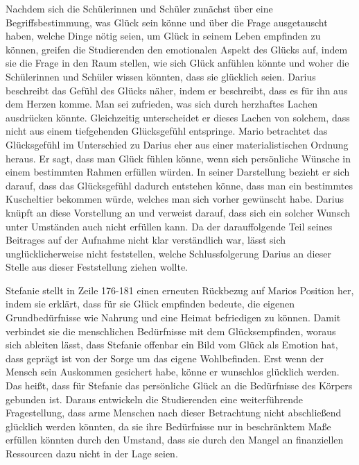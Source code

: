 Nachdem sich die Schülerinnen und Schüler zunächst über eine Begriffsbestimmung, was Glück sein könne und über die Frage ausgetauscht haben, welche Dinge nötig seien, um Glück in seinem Leben empfinden zu können, greifen die Studierenden den emotionalen Aspekt des Glücks auf, indem sie die Frage in den Raum stellen, wie sich Glück anfühlen könnte und woher die Schülerinnen und Schüler wissen könnten, dass sie glücklich seien. 
Darius beschreibt das Gefühl des Glücks näher, indem er beschreibt, dass es für ihn aus dem Herzen komme. 
Man sei zufrieden, was sich durch herzhaftes Lachen ausdrücken könnte. 
Gleichzeitig unterscheidet er dieses Lachen von solchem, dass nicht aus einem tiefgehenden Glücksgefühl entspringe. 
Mario betrachtet das Glücksgefühl im Unterschied zu Darius eher aus einer materialistischen Ordnung heraus. 
Er sagt, dass man Glück fühlen könne, wenn sich persönliche Wünsche in einem bestimmten Rahmen erfüllen würden. 
In seiner Darstellung bezieht er sich darauf, dass das Glücksgefühl dadurch entstehen könne, dass man ein bestimmtes Kuscheltier bekommen würde, welches man sich vorher gewünscht habe. 
Darius knüpft an diese Vorstellung an und verweist darauf, dass sich ein solcher Wunsch unter Umständen auch nicht erfüllen kann. 
Da der darauffolgende Teil seines Beitrages auf der Aufnahme nicht klar verständlich war, lässt sich unglücklicherweise nicht feststellen, welche Schlussfolgerung Darius an dieser Stelle aus dieser Feststellung ziehen wollte. 

Stefanie stellt in Zeile 176-181 einen erneuten Rückbezug auf Marios Position her, indem sie erklärt, dass für sie Glück empfinden bedeute, die eigenen Grundbedürfnisse wie Nahrung und eine Heimat befriedigen zu können. 
Damit verbindet sie die menschlichen Bedürfnisse mit dem Glücksempfinden, woraus sich ableiten lässt, dass Stefanie offenbar ein Bild vom Glück als Emotion hat, dass geprägt ist von der Sorge um das eigene Wohlbefinden. 
Erst wenn der Mensch sein Auskommen gesichert habe, könne er wunschlos glücklich werden. 
Das heißt, dass für Stefanie das persönliche Glück an die Bedürfnisse des Körpers gebunden ist. 
Daraus entwickeln die Studierenden eine weiterführende Fragestellung, dass arme Menschen nach dieser Betrachtung nicht abschließend glücklich werden könnten, da sie ihre Bedürfnisse nur in beschränktem Maße erfüllen könnten durch den Umstand, dass sie durch den Mangel an finanziellen Ressourcen dazu nicht in der Lage seien. 

